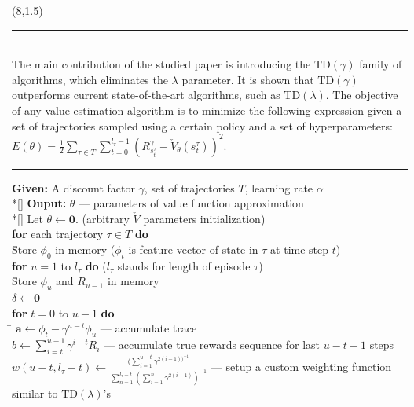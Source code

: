 \documentclass[a0]{a0poster}
\def\Head#1{\noindent{\LARGE\color{bluegray} #1}\bigskip}
\begin{document}
\begin{textblock}{7.0}(8,1.5)

\medskip
\hrule\medskip
\Head{$\text{TD}(\gamma)$ Algorithm}\\

The main contribution of the studied paper is introducing the
$\text{TD}(\gamma)$ family of algorithms, which eliminates the $\lambda$
parameter. It is shown that $\text{TD}(\gamma)$ outperforms current
state-of-the-art algorithms, such as $\text{TD}(\lambda)$. The objective of any
value estimation algorithm is to minimize the following expression given a set
of trajectories sampled using a certain policy and a set of hyperparameters:
$E(\theta) = \frac{1}{2} \sum_{\tau \in T} \sum_{t = 0}^{l_\tau - 1}
{(R_{s_t^\tau}^\gamma - \check{V}_\theta(s_t^\tau))}^2$.

\noindent\rule[-5pt]{.9\textwidth}{0.4pt}
{\footnotesize
\begin{tabbing}
    {\bf Given:} A discount factor $\gamma$, set of trajectories $T$, learning rate $\alpha$ \\*[\smallskipamount]
    {\bf Ouput:} $\theta$ --- parameters of value function approximation \\*[\smallskipamount]
    Let $\theta \leftarrow \boldsymbol{0}$. (arbitrary $\check{V}$ parameters initialization) \\
    {\bf for} each trajectory $\tau \in T$ {\bf do} \\
      \qquad \= Store $\phi_0$ in memory ($\phi_t$ is feature vector of state in $\tau$ at time step $t$) \\
      \> {\bf for} $u = 1$ to $l_\tau$ {\bf do} ($l_\tau$ stands for length of episode $\tau$) \\
      \> \qquad \= Store $\phi_u$ and $R_{u - 1}$ in memory \\
      \>  \> $\delta \leftarrow \boldsymbol{0}$ \\
      \>  \> {\bf for} $t = 0$ to $u - 1$ {\bf do} \\
      \>  \> \qquad \= $\boldsymbol{a} \leftarrow \phi_t - \gamma^{u - t} \phi_u$ --- accumulate trace \\
      \>  \>  \> $b \leftarrow \sum_{i = t}^{u - 1} \gamma^{i - t} R_i$ --- accumulate true rewards sequence for last $u - t - 1$ steps \\
      \>  \>  \> $w(u - t, l_\tau - t) \leftarrow \frac{(\sum_{i=1}^{u - t} \gamma^{2(i - 1))^{-1}}}{\sum_{n = 1}^{l_\tau - t} ({\sum_{i = 1}^n \gamma^{2(i - 1)}})^{-1}}$ --- setup a custom weighting function similar to $\text{TD}(\lambda)$'s \\

\end{tabbing}}
\end{textblock}
\end{document}
